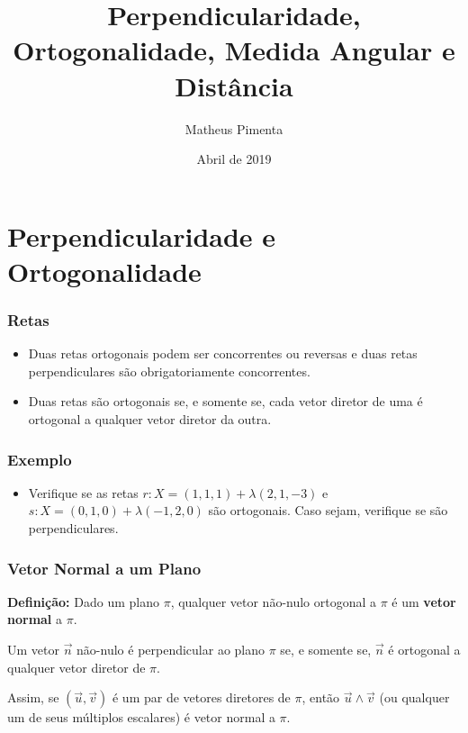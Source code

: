 \documentclass[hyperref={pdfpagelabels=false}]{beamer}
\title{Perpendicularidade, Ortogonalidade, Medida Angular e Distância}
\author[Matheus Pimenta]{Matheus Pimenta}
\institute[UTFPR-CP]{\normalsize Universidade Tecnológica Federal do Paraná \\
	Câmpus Cornélio Procópio
}
\date{Abril de 2019}
\begin{document}
	
\begin{frame}
\titlepage
\end{frame} 




\section{Perpendicularidade e Ortogonalidade} 


\begin{frame}
\frametitle{Retas} 
\begin{itemize}

	\item Duas retas ortogonais podem ser concorrentes ou reversas e duas retas perpendiculares são obrigatoriamente concorrentes.
	\item Duas retas são ortogonais se, e somente se, cada vetor diretor de uma é ortogonal a qualquer vetor diretor da outra.
\end{itemize}
\end{frame}

\begin{frame}
\frametitle{Exemplo}
\begin{itemize}
	\item Verifique se as retas $r: X = (1,1,1) + \lambda(2,1,-3)$ e $s: X = (0,1,0) + \lambda(-1,2,0)$ são ortogonais. Caso sejam, verifique se são perpendiculares.
\end{itemize}

\end{frame}

\begin{frame}
\frametitle{Vetor Normal a um Plano}
{\bf Definição:} Dado um plano $\pi$, qualquer vetor não-nulo ortogonal a $\pi$ é um {\bf vetor normal} a $\pi$.

\pause

Um vetor $\overrightarrow{n}$ não-nulo é perpendicular ao plano $\pi$ se, e somente se, $\overrightarrow{n}$ é ortogonal a qualquer vetor diretor de $\pi$.

\pause
Assim, se $(\overrightarrow{u}, \overrightarrow{v})$ é um par de vetores diretores de $\pi$, então $\overrightarrow{u} \land \overrightarrow{v}$ (ou qualquer um de seus múltiplos escalares) é vetor normal a $\pi$.

\end{frame}
\end{document}
